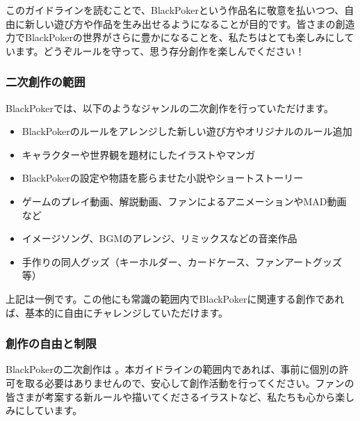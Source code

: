 \documentclass[letterpaper,10pt,dvipdfmx]{sphinxmanual}
\begin{document}
\sphinxAtStartPar
このガイドラインを読むことで、BlackPokerという作品名に敬意を払いつつ、自由に新しい遊び方や作品を生み出せるようになることが目的です。皆さまの創造力でBlackPokerの世界がさらに豊かになることを、私たちはとても楽しみにしています。どうぞルールを守って、思う存分創作を楽しんでください！


\subsubsection{二次創作の範囲}
\label{\detokenize{appendix/guideline/fanworks:id3}}
\sphinxAtStartPar
BlackPokerでは、以下のようなジャンルの二次創作を行っていただけます。
\begin{itemize}
\item {} 
\sphinxAtStartPar
{}
BlackPokerのルールをアレンジした新しい遊び方やオリジナルのルール追加

\item {} 
\sphinxAtStartPar
{}
キャラクターや世界観を題材にしたイラストやマンガ

\item {} 
\sphinxAtStartPar
{}
BlackPokerの設定や物語を膨らませた小説やショートストーリー

\item {} 
\sphinxAtStartPar
{}
ゲームのプレイ動画、解説動画、ファンによるアニメーションやMAD動画など

\item {} 
\sphinxAtStartPar
{}
イメージソング、BGMのアレンジ、リミックスなどの音楽作品

\item {} 
\sphinxAtStartPar
{}
手作りの同人グッズ（キーホルダー、カードケース、ファンアートグッズ等）

\end{itemize}

\sphinxAtStartPar
上記は一例です。この他にも常識の範囲内でBlackPokerに関連する創作であれば、基本的に自由にチャレンジしていただけます。


\subsubsection{創作の自由と制限}
\label{\detokenize{appendix/guideline/fanworks:id4}}
\sphinxAtStartPar
BlackPokerの二次創作は  。本ガイドラインの範囲内であれば、事前に個別の許可を取る必要はありませんので、安心して創作活動を行ってください。ファンの皆さまが考案する新ルールや描いてくださるイラストなど、私たちも心から楽しみにしています。
\end{document}
